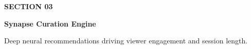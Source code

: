 \documentclass[aspectratio=169,11pt]{beamer}
\begin{document}
{
\begin{frame}[plain]
  \vspace*{36pt}
  \begin{minipage}{0.85\textwidth}
    {\color{accentcyan}\large\bfseries\faBrain\quad SECTION 03} \par
    \vspace{12pt}
    {\fontsize{26pt}{32pt}\selectfont \color{white}\bfseries Synapse Curation Engine} \par
    \vspace{8pt}
    {\fontsize{14pt}{18pt}\selectfont \color{textlight} Deep neural recommendations driving viewer engagement and session length.}
  \end{minipage}
  \vspace*{24pt}
\end{frame}
}
\end{document}
